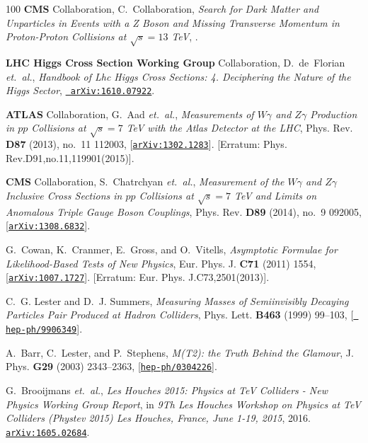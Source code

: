\documentclass[11pt]{article}
\renewcommand{\[}{\begin{equation}}
\renewcommand{\]}{\end{equation}}
\begin{document}
\begin{thebibliography}{100}
{\bf CMS} Collaboration, C.~Collaboration, {\it {Search for Dark Matter and
  Unparticles in Events with a Z Boson and Missing Transverse Momentum in
  Proton-Proton Collisions at $\sqrt{s} = 13$ TeV}}, .

{\bf LHC Higgs Cross Section Working Group} Collaboration, D.~de~Florian {\em
  et.~al.}, {\it {Handbook of Lhc Higgs Cross Sections: 4. Deciphering the
  Nature of the Higgs Sector}},  \href{http://xxx.lanl.gov/abs/1610.07922}{{\tt
  arXiv:1610.07922}}.

{\bf ATLAS} Collaboration, G.~Aad {\em et.~al.}, {\it {Measurements of $W
  \gamma$ and $Z \gamma$ Production in $pp$ Collisions at $\sqrt{s}=7$ TeV with
  the Atlas Detector at the LHC}},  Phys. Rev. {\bf D87} (2013), no.~11 112003,
  [\href{http://xxx.lanl.gov/abs/1302.1283}{{\tt arXiv:1302.1283}}]. [Erratum:
  Phys. Rev.D91,no.11,119901(2015)].

{\bf CMS} Collaboration, S.~Chatrchyan {\em et.~al.}, {\it {Measurement of the
  $W\gamma$ and $Z\gamma$ Inclusive Cross Sections in $pp$ Collisions at
  $\sqrt{s}=7$ TeV and Limits on Anomalous Triple Gauge Boson Couplings}},
  Phys. Rev. {\bf D89} (2014), no.~9 092005,
  [\href{http://xxx.lanl.gov/abs/1308.6832}{{\tt arXiv:1308.6832}}].

G.~Cowan, K.~Cranmer, E.~Gross, and O.~Vitells, {\it {Asymptotic Formulae for
  Likelihood-Based Tests of New Physics}},  Eur. Phys. J. {\bf C71} (2011)
  1554, [\href{http://xxx.lanl.gov/abs/1007.1727}{{\tt arXiv:1007.1727}}].
  [Erratum: Eur. Phys. J.C73,2501(2013)].

C.~G. Lester and D.~J. Summers, {\it {Measuring Masses of Semiinvisibly
  Decaying Particles Pair Produced at Hadron Colliders}},  Phys. Lett. {\bf
  B463} (1999) 99--103, [\href{http://xxx.lanl.gov/abs/hep-ph/9906349}{{\tt
  hep-ph/9906349}}].

A.~Barr, C.~Lester, and P.~Stephens, {\it {M(T2): the Truth Behind the
  Glamour}},  J. Phys. {\bf G29} (2003) 2343--2363,
  [\href{http://xxx.lanl.gov/abs/hep-ph/0304226}{{\tt hep-ph/0304226}}].

G.~Brooijmans {\em et.~al.}, {\it {Les Houches 2015: Physics at TeV Colliders -
  New Physics Working Group Report}},  in {\em {9Th Les Houches Workshop on
  Physics at TeV Colliders (Phystev 2015) Les Houches, France, June 1-19,
  2015}}, 2016.
\newblock \href{http://xxx.lanl.gov/abs/1605.02684}{{\tt arXiv:1605.02684}}.


\end{thebibliography}
\end{document}
